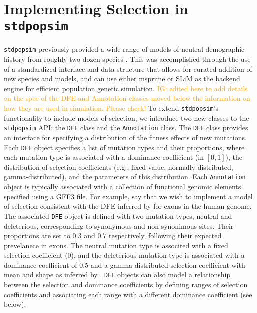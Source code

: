 \documentclass[hidelinks]{article}
\newcommand{\stdpopsim}{\texttt{stdpopsim}\xspace}
\newcommand{\igcomment}[1]{\textcolor{orange}{IG: #1}}
\begin{document}
\section*{Implementing Selection in \stdpopsim}
    \label{selection}

    \stdpopsim previously provided a wide range of models of neutral
    demographic history from roughly two dozen species \citep{lauterbur2023expanding}.
    This was accomplished through the use of a standardized interface
    and data structure that allows for curated addition of new
    species and models, and can use either
    msprime \citep{Baumdicker2022} or SLiM \citep{haller2019slim}
    as the backend engine for efficient population genetic simulation.
    \igcomment{edited here to add details on the spec of the DFE and Annotation classes
    moved below the information on how they are used in simulation. Please check!}
    To extend \stdpopsim's functionality to include models of selection, 
    we introduce two new classes
    to the \stdpopsim API: the \texttt{DFE} class and the \texttt{Annotation} class.
    The \texttt{DFE} class provides an interface for specifying
    a distribution of the fitness effects of new mutations.
    Each \texttt{DFE} object specifies a list of mutation types and
    their proportions, where 
    each mutation type is associated with a dominance coefficient (in $[0,1]$),
    the distribution of selection coefficients (e.g., fixed-value, normally-distributed, gamma-distributed),
    and the parameters of this distribution.
    Each \texttt{Annotation} object is typically associated with a collection of functional
    genomic elements specified using a GFF3 file. %
    For example, say that we wish to implement a model of selection consistent with the
    DFE inferred by \citep{kim2017inference} for exons in the human genome.
    The associated \texttt{DFE} object is defined with two mutation types,
    neutral and deleterious, corresponding to synonymous and non-synonimous sites.
    Their proportions are set to $0.3$ and $0.7$ respectively, following their expected
    prevelanece in exons.
    The neutral mutation type is associted with a fixed selection coefficient (0),
    and the deleterious mutation type is associated with a dominance coefficient of $0.5$ and
    a gamma-distributed selection coefficient
    with mean and shape as inferred by \citep{kim2017inference}.
    \texttt{DFE} objects can also model a relationship between the selection and dominance coefficients
    by defining ranges of selection coefficients and associating each range with a different dominance coefficient (see below).
    
\end{document}
